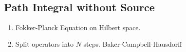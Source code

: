 \subsection{Path Integral without Source}
\begin{enumerate}
  \item {Fokker-Planck Equation on Hilbert space.  }
  \item {Split operators into $N$ steps.  Baker-Campbell-Hausdorff}


\end{enumerate}
